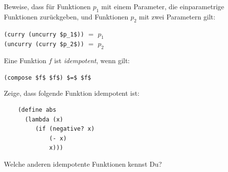 \begin{aufgabe}
  Beweise, dass für Funktionen $p_1$ mit einem Parameter, die
  einparametrige Funktionen zurückgeben, und Funktionen $p_2$ mit zwei
  Parametern gilt:
  \begin{center}
    \lstinline{(curry (uncurry $p_1$))} $=$ $p_1$\\
    \lstinline{(uncurry (curry $p_2$))} $=$ $p_2$
  \end{center}
 \end{aufgabe}

\begin{aufgabe}
  Eine Funktion $f$ ist \textit{idempotent}, wenn gilt:

  \begin{center}
    \lstinline{(compose $f$ $f$) $=$ $f$}
  \end{center}

  Zeige, dass folgende Funktion idempotent ist:

  \begin{lstlisting}
    (define abs
      (lambda (x)
         (if (negative? x)
             (- x)
             x)))  \end{lstlisting}

  Welche anderen idempotente Funktionen kennst Du?
\end{aufgabe}

